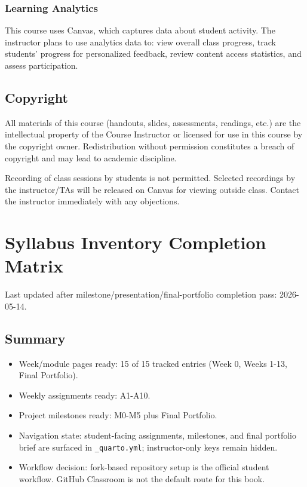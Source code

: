 \documentclass[
  letterpaper,
  DIV=11,
  numbers=noendperiod,
  oneside]{scrreprt}
\providecommand{\tightlist}{%
  \setlength{\itemsep}{0pt}\setlength{\parskip}{0pt}}
\begin{document}
\subsection{Learning Analytics}\label{learning-analytics}

This course uses Canvas, which captures data about student activity. The
instructor plans to use analytics data to: view overall class progress,
track students' progress for personalized feedback, review content
access statistics, and assess participation.

\section{Copyright}\label{copyright}

All materials of this course (handouts, slides, assessments, readings,
etc.) are the intellectual property of the Course Instructor or licensed
for use in this course by the copyright owner. Redistribution without
permission constitutes a breach of copyright and may lead to academic
discipline.

Recording of class sessions by students is not permitted. Selected
recordings by the instructor/TAs will be released on Canvas for viewing
outside class. Contact the instructor immediately with any objections.

\chapter{Syllabus Inventory Completion
Matrix}\label{syllabus-inventory-completion-matrix}

Last updated after milestone/presentation/final-portfolio completion
pass: 2026-05-14.

\section{Summary}\label{summary}

\begin{itemize}
\tightlist
\item
  Week/module pages ready: 15 of 15 tracked entries (Week 0, Weeks 1-13,
  Final Portfolio).
\item
  Weekly assignments ready: A1-A10.
\item
  Project milestones ready: M0-M5 plus Final Portfolio.
\item
  Navigation state: student-facing assignments, milestones, and final
  portfolio brief are surfaced in \texttt{\_quarto.yml}; instructor-only
  keys remain hidden.
\item
  Workflow decision: fork-based repository setup is the official student
  workflow. GitHub Classroom is not the default route for this book.
\end{itemize}
\end{document}
